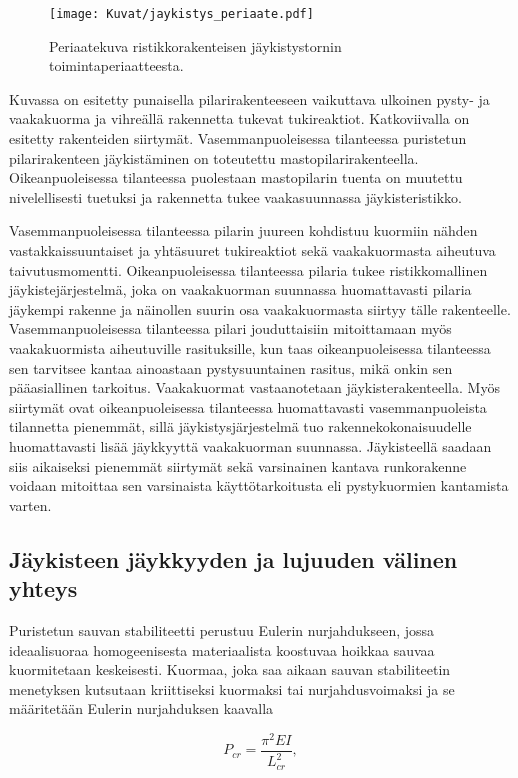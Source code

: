 \documentclass[12pt]{article}
\newenvironment{content}{\pagenumbering{arabic}}{}
\begin{document}
\begin{content}
\begin{figure}[htb]
\centering
\texttt{[image: Kuvat/jaykistys\_periaate.pdf]}
\caption{Periaatekuva ristikkorakenteisen jäykistystornin toimintaperiaatteesta.}
\label{fig:jaykistys_periaate}
\end{figure}

Kuvassa on esitetty punaisella pilarirakenteeseen vaikuttava ulkoinen pysty- ja vaakakuorma ja vihreällä rakennetta tukevat tukireaktiot. Katkoviivalla on esitetty rakenteiden siirtymät. Vasemmanpuoleisessa tilanteessa puristetun pilarirakenteen jäykistäminen on toteutettu mastopilarirakenteella. Oikeanpuoleisessa tilanteessa puolestaan mastopilarin tuenta on muutettu nivelellisesti tuetuksi ja rakennetta tukee vaakasuunnassa jäykisteristikko. 

Vasemmanpuoleisessa tilanteessa pilarin juureen kohdistuu kuormiin nähden vastakkaissuuntaiset ja yhtäsuuret tukireaktiot sekä vaakakuormasta aiheutuva taivutusmomentti. Oikeanpuoleisessa tilanteessa pilaria tukee ristikkomallinen jäykistejärjestelmä, joka on vaakakuorman suunnassa huomattavasti pilaria jäykempi rakenne ja näinollen suurin osa vaakakuormasta siirtyy tälle rakenteelle. Vasemmanpuoleisessa tilanteessa pilari jouduttaisiin mitoittamaan myös vaakakuormista aiheutuville rasituksille, kun taas oikeanpuoleisessa tilanteessa sen tarvitsee kantaa ainoastaan pystysuuntainen rasitus, mikä onkin sen pääasiallinen tarkoitus. Vaakakuormat vastaanotetaan jäykisterakenteella. Myös siirtymät ovat oikeanpuoleisessa tilanteessa huomattavasti vasemmanpuoleista tilannetta pienemmät, sillä jäykistysjärjestelmä tuo rakennekokonaisuudelle huomattavasti lisää jäykkyyttä vaakakuorman suunnassa. Jäykisteellä saadaan siis aikaiseksi pienemmät siirtymät sekä varsinainen kantava runkorakenne voidaan mitoittaa sen varsinaista käyttötarkoitusta eli pystykuormien kantamista varten.
 

\subsection{Jäykisteen jäykkyyden ja lujuuden välinen yhteys}

Puristetun sauvan stabiliteetti perustuu Eulerin nurjahdukseen, jossa ideaalisuoraa homogeenisesta materiaalista koostuvaa hoikkaa sauvaa kuormitetaan keskeisesti. Kuormaa, joka saa aikaan sauvan stabiliteetin menetyksen kutsutaan kriittiseksi kuormaksi tai nurjahdusvoimaksi ja se määritetään Eulerin nurjahduksen kaavalla

\begin{equation}
\label{euler}
P_{cr} = \frac{\pi^2 E I}{L_{cr}^2},
\end{equation}


\end{content}
\end{document}

